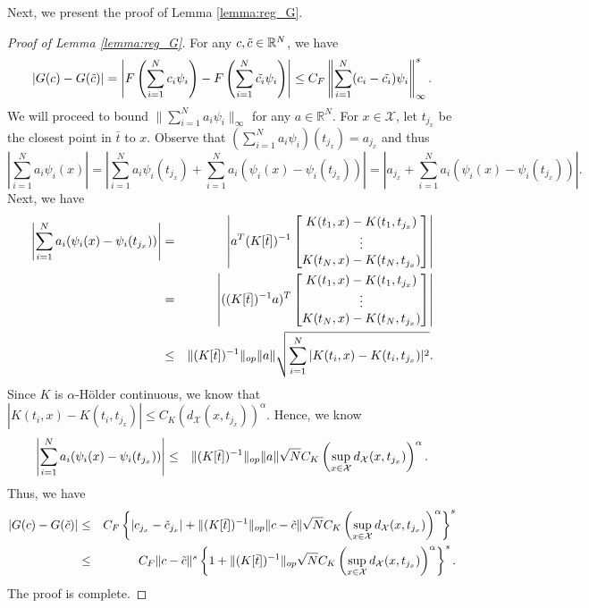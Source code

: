 \documentclass{article}
\def\RR{\mathbb R}
\numberwithin{equation}{section}
\begin{document}
\begin{appendices}
Next, we present the proof of Lemma \ref{lemma:reg_G}. 
\begin{proof}[Proof of Lemma \ref{lemma:reg_G}]
For any $c, \Tilde{c} \in \RR^N$, we have 
\begin{equation}
   | G(c) - G(\Tilde{c})| = \left|F\left(\sum_{i=1}^N c_i \psi_i\right) - F\left(\sum_{i=1}^N \Tilde{c_i} \psi_i\right)\right| \leq C_F \left\|\sum_{i=1}^N (c_i - \Tilde{c_i}) \psi_i\right\|^s_\infty.
\end{equation}
We will proceed to bound $\|\sum_{i=1}^N a_i\psi_i\|_\infty$ for any $a\in \RR^N$. 
For $x\in \mathcal{X}$, let $t_{j_x}$ be the closest point in $\bar{t}$ to $x$. Observe that $\left(\sum_{i=1}^N a_i\psi_i\right)(t_{j_x}) = a_{j_x}$ and thus 
\begin{equation*}
    \left|\sum_{i=1}^N a_i\psi_i(x)\right| = \left|\sum_{i=1}^N a_i\psi_i(t_{j_x}) + \sum_{i=1}^N a_i (\psi_i(x) - \psi_i(t_{j_x}))\right| = \left|a_{j_x} + \sum_{i=1}^N a_i (\psi_i(x) - \psi_i(t_{j_x}))\right|.
\end{equation*}
Next, we have \begin{eqnarray*}
    \left|\sum_{i=1}^N a_i (\psi_i(x) - \psi_i(t_{j_x}))\right| &=& \left|a^T (K[\Bar{t}])^{-1 } \begin{bmatrix}
        K(t_1, x) - K(t_1, t_{j_x})\\
        \vdots\\
        K(t_N, x) - K(t_N, t_{j_x})
    \end{bmatrix}\right|\\
    &=& \left|((K[\Bar{t}])^{-1 }a)^T \begin{bmatrix}
        K(t_1, x) - K(t_1, t_{j_x})\\
        \vdots\\
        K(t_N, x) - K(t_N, t_{j_x})
    \end{bmatrix}\right|\\
    &\leq& \|(K[\Bar{t}])^{-1 }\|_{op} \|a\| \sqrt{\sum_{i=1}^N | K(t_i, x) - K(t_i, t_{j_x})|^2}.
    \end{eqnarray*}  
    Since $K$ is $\alpha$-H\"older continuous, we know that  
      $| K(t_i, x) - K(t_i, t_{j_x})| \leq  C_K\left(d_\mathcal{X}(x,t_{j_x})\right)^\alpha. $ Hence, we know 
 \begin{eqnarray*}
    \left|\sum_{i=1}^N a_i (\psi_i(x) - \psi_i(t_{j_x}))\right| 
     &\leq& \|(K[\Bar{t}])^{-1 }\|_{op} \|a\| \sqrt{N} C_K\left(\sup_{x\in \mathcal{X}}d_\mathcal{X}(x,t_{j_x})\right)^\alpha. 
    \end{eqnarray*}     
          Thus, we have
\begin{eqnarray*}
    | G(c) - G(\Tilde{c})| 
    &\leq& C_F \left\{\left|c_{j_x} - \Tilde{c}_{j_x}\right| + \|(K[\Bar{t}])^{-1 }\|_{op} \|c - \Tilde{c}\|\sqrt{N} C_K\left(\sup_{x\in \mathcal{X}} d_\mathcal{X}(x,t_{j_x})\right)^\alpha\right\}^s\\
    &\leq& C_F \|c - \Tilde{c}\|^s \left\{1 + \|(K[\Bar{t}])^{-1 }\|_{op} \sqrt{N} C_K\left(\sup_{x\in \mathcal{X}} d_\mathcal{X}(x,t_{j_x})\right)^\alpha\right\}^s.
\end{eqnarray*}
The proof is complete. 
\end{proof}


\end{appendices}
\end{document}
